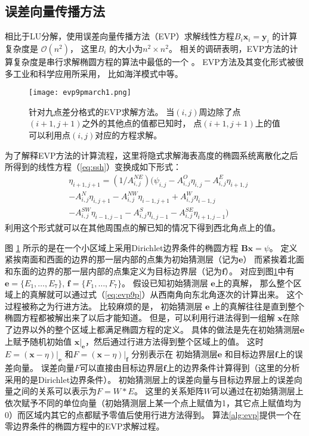  

\subsection{误差向量传播方法}
\label{precond:EVP:EVP}

相比于LU分解，使用误差向量传播方法（EVP）求解线性方程$B_i \textbf{x}_i =\textbf{y}_i$ 的计算复杂度是 $\mathcal{O}(n^2)$， 这里$B_i$ 的大小为$n^2\times n^2$。 
相关的调研表明，EVP方法的计算复杂度是串行求解椭圆方程的算法中最低的一个 \cite{roache1995elliptic}。 
EVP方法及其变化形式被很多工业和科学应用所采用， 比如海洋模式中\cite{dietrich1987ocean,tseng2011parallel}等。 


\begin {figure}[!t]
\centering
\texttt{[image: evp9pmarch1.png]}
\caption []{针对九点差分格式的EVP求解方法。 当$(i,j)$周边除了点 $(i+1,j+1)$之外的其他点的值都已知时， 点$(i+1,j+1)$上的值可以利用点$(i,j)$对应的方程求解。 \label {fig:evp9p}}
\end {figure}

为了解释EVP方法的计算流程，这里将隐式求解海表高度的椭圆系统离散化之后所得到的线性方程（\ref{eq:ssh}）变换成如下形式：
\begin{eqnarray}
\label{eq:evp9p}
&\eta_{i+1,j+1} = (1/A_{i,j}^{NE} )(\psi_{i,j} - A_{i,j}^O\eta_{i,j}-A_{i,j}^E\eta_{i+1,j} \nonumber\\
&-A_{i,j}^N\eta_{i,j+1}-A_{i,j}^{NW}\eta_{i-1,j+1} +A_{i,j}^W\eta_{i-1,j}\nonumber\\
&-A_{i,j}^{SW}\eta_{i-1,j-1}-A_{i,j}^S\eta_{i,j-1}- A_{i,j}^{SE}\eta_{i+1,j-1} )
\end{eqnarray}
利用这个形式就可以在其他周围点的解已知的情况下得到西北角点上的值。 


图 \ref{fig:evp9p} 所示的是在一个小区域上采用Dirichlet边界条件的椭圆方程
 $\textbf{B}\textbf{x} = \psi$。
定义紧挨南面和西面的边界的那一层内部的点集为初始猜测层（记为$\textbf{e}$） 
而紧挨着北面和东面的边界的那一层内部的点集定义为目标边界层（记为$\textbf{f}$）。 
对应到图\ref{fig:evp9p}中有
$\textbf{e}= \{E_1, \dots, E_7\}$, $\textbf{f}= \{F_1, \dots, F_7\}$。 
假设已知初始猜测层 $\textbf{e}$上的真解，  
那么整个区域上的真解就可以通过式（\ref{eq:evp9p}）从西南角向东北角逐次的计算出来。 
这个过程被称之为行进方法。
比较麻烦的是， 初始猜测层 $\textbf{e}$ 上的真解往往是直到整个椭圆方程都被解出来了以后才能知道。
但是，可以利用行进法得到一组解
$\textbf{x}$在除了边界以外的整个区域上都满足椭圆方程的定义。 
具体的做法是先在初始猜测层$\textbf{e}$上赋予随机初始值
$\textbf{x}|_\textbf{e}$，然后通过行进方法得到整个区域上的值。 
这时$E=(\textbf{x} -\eta)|_\textbf{e}$
和$F=(\textbf{x} -\eta)|_\textbf{f}$ 分别表示在
初始猜测层$\textbf{e}$ 和目标边界层$\textbf{f}$上的误差向量。
误差向量$F$可以直接由目标边界层$\textbf{f}$上的边界条件计算得到（这里的分析采用的是Dirichlet边界条件）。 
初始猜测层上的误差向量与目标边界层上的误差向量之间的关系可以表示为$F=W*E$。
这里的关系矩阵$W$可以通过在初始猜测层上依次赋予不同的单位向量（初始猜测层上某一个点上赋值为1，其它点上赋值均为0）而区域内其它的点都赋予零值后使用行进方法得到。 
算法\ref{alg:evp}提供一个在零边界条件的椭圆方程中的EVP求解过程。 


